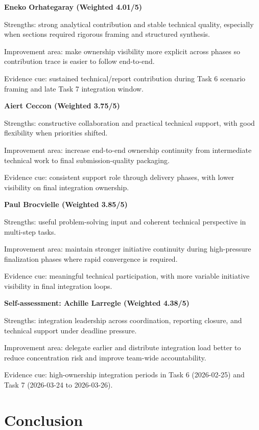 \noindent \textbf{Eneko Orhategaray (Weighted 4.01/5)}

\noindent Strengths: strong analytical contribution and stable technical quality, especially when sections required rigorous framing and structured synthesis.

\noindent Improvement area: make ownership visibility more explicit across phases so contribution trace is easier to follow end-to-end.

\noindent Evidence cue: sustained technical/report contribution during Task 6 scenario framing and late Task 7 integration window.


\noindent \textbf{Aiert Ceccon (Weighted 3.75/5)}

\noindent Strengths: constructive collaboration and practical technical support, with good flexibility when priorities shifted.

\noindent Improvement area: increase end-to-end ownership continuity from intermediate technical work to final submission-quality packaging.

\noindent Evidence cue: consistent support role through delivery phases, with lower visibility on final integration ownership.


\noindent \textbf{Paul Brocvielle (Weighted 3.85/5)}

\noindent Strengths: useful problem-solving input and coherent technical perspective in multi-step tasks.

\noindent Improvement area: maintain stronger initiative continuity during high-pressure finalization phases where rapid convergence is required.

\noindent Evidence cue: meaningful technical participation, with more variable initiative visibility in final integration loops.


\noindent \textbf{Self-assessment: Achille Larregle (Weighted 4.38/5)}

\noindent Strengths: integration leadership across coordination, reporting closure, and technical support under deadline pressure.

\noindent Improvement area: delegate earlier and distribute integration load better to reduce concentration risk and improve team-wide accountability.

\noindent Evidence cue: high-ownership integration periods in Task 6 (2026-02-25) and Task 7 (2026-03-24 to 2026-03-26).


\chapter{Conclusion}


